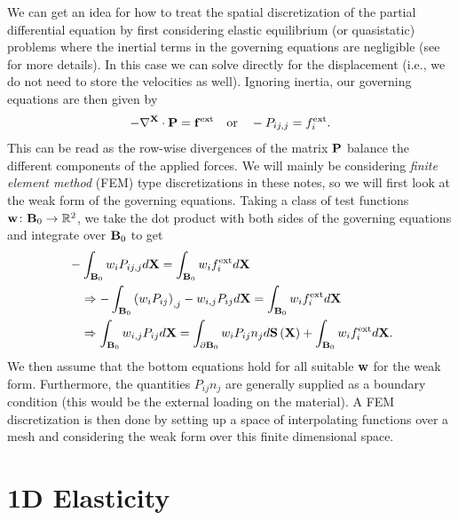 We can get an idea for how to treat the spatial discretization of the partial differential equation by first considering elastic equilibrium (or quasistatic) problems where the inertial terms in the governing equations are negligible (see \cite{Teran05a} for more details). In this case we can solve directly for the displacement (i.e., we do not need to store the velocities as well). Ignoring inertia, our governing equations are then given by
\begin{equation*}
-\nabla^{\mathbf{X}} \cdot \mathbf{P} = \mathbf{f}^{\text{ext}} \quad \text{or} \quad -P_{ij,j} = f^{\text{ext}}_i.
\end{equation*}
This can be read as the row-wise divergences of the matrix $\mathbf{P}$ balance the different components of the applied forces. We will mainly be considering \emph{finite element method} (FEM) type discretizations in these notes, so we will first look at the weak form of the governing equations. Taking a class of test functions $\mathbf{w} \colon \mathbf{B}_0 \to \mathbb{R}^2$, we take the dot product with both sides of the governing equations and integrate over $\mathbf{B}_0$ to get
\begin{align*}
& -\int_{\mathbf{B}_0} w_i P_{ij,j} d\mathbf{X} = \int_{\mathbf{B}_0} w_i f^{\text{ext}}_i d\mathbf{X} \\
& \quad \Rightarrow -\int_{\mathbf{B}_0} \left( w_i P_{ij} \right)_{,j} - w_{i,j} P_{ij} d\mathbf{X} = \int_{\mathbf{B}_0} w_i f^{\text{ext}}_i d\mathbf{X} \\
& \quad \Rightarrow \int_{\mathbf{B}_0} w_{i,j} P_{ij} d\mathbf{X} = \int_{\partial\mathbf{B}_0} w_i P_{ij} n_j d\mathbf{S} \left( \mathbf{X} \right) + \int_{\mathbf{B}_0} w_i f^{\text{ext}}_i d\mathbf{X}.
\end{align*}
We then assume that the bottom equations hold for all suitable $\mathbf{w}$ for the weak form. Furthermore, the quantities $P_{ij} n_j$ are generally supplied as a boundary condition (this would be the external loading on the material). A FEM discretization is then done by setting up a space of interpolating functions over a mesh and considering the weak form over this finite dimensional space.

\section{1D Elasticity}

